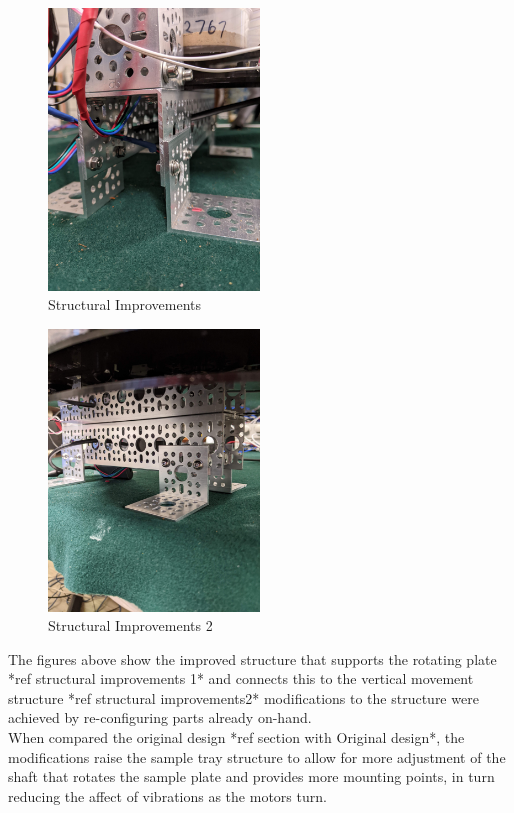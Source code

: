 \documentclass{UoNMCHA}
\numberwithin{equation}{section}
\begin{document}
\begin{figure}[h]
	\centering
	\includegraphics[width=0.5\textwidth]{STRUCTURAL_IMPROVEMENTS.jpg}
	\caption{Structural Improvements}
	\label{fig:Structural Improvements}
\end{figure}
\begin{figure}[h]
	\centering
	\includegraphics[width=0.5\textwidth]{STRUCTURAL_IMPROVEMENTS2.jpg}
	\caption{Structural Improvements 2}
	\label{fig:Structural Improvements 2}
\end{figure}
The figures above show the improved structure that supports the rotating plate *ref structural improvements 1* and connects this to the vertical movement structure *ref structural improvements2* modifications to the structure were achieved by re-configuring parts already on-hand. \\
When compared the original design *ref section with Original design*, the modifications raise the sample tray structure to allow for more adjustment of the shaft that rotates the sample plate and provides more mounting points, in turn reducing the affect of vibrations as the motors turn. \\
\end{document}
